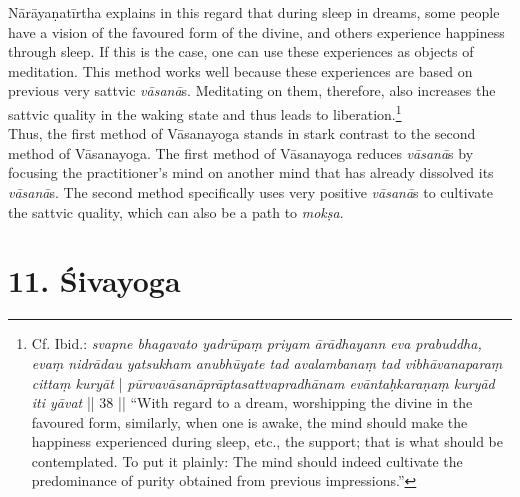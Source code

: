 Nārāyaṇatīrtha explains in this regard that during sleep in dreams, some people have a vision of the favoured form of the divine, and others experience happiness through sleep. If this is the case, one can use these experiences as objects of meditation. This method works well because these experiences are based on previous very sattvic \textit{vāsanā}s. Meditating on them, therefore, also increases the sattvic quality in the waking state and thus leads to liberation.\footnote{Cf. Ibid.: \textit{svapne bhagavato yadrūpaṃ priyam ārādhayann eva prabuddha, evaṃ nidrādau yatsukham anubhūyate tad avalambanaṃ tad vibhāvanaparaṃ cittaṃ kuryāt} | \textit{pūrvavāsanāprāptasattvapradhānam evāntaḥkaraṇaṃ kuryād iti yāvat} || 38 || ``With regard to a dream, worshipping the divine in the favoured form, similarly, when one is awake, the mind should make the happiness experienced during sleep, etc., the support; that is what should be contemplated. To put it plainly: The mind should indeed cultivate the predominance of purity obtained from previous impressions.''}\\

Thus, the first method of Vāsanayoga stands in stark contrast to the second method of Vāsanayoga. The first method of Vāsanayoga reduces \textit{vāsanā}s by focusing the practitioner's mind on another mind that has already dissolved its \textit{vāsanā}s. The second method specifically uses very positive \textit{vāsanā}s to cultivate the sattvic quality, which can also be a path to \textit{mokṣa}.   

\section{11. Śivayoga}
\label{sivayogaintro}

